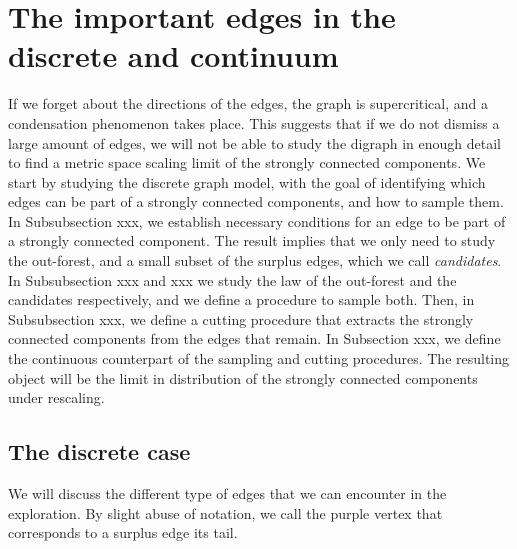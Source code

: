 \section{The important edges in the discrete and continuum}
If we forget about the directions of the edges, the graph is supercritical, and a condensation phenomenon takes place. This suggests that if we do not dismiss a large amount of edges, we will not be able to study the digraph in enough detail to find a metric space scaling limit of the strongly connected components. We start by studying the discrete graph model, with the goal of identifying which edges can be part of a strongly connected components, and how to sample them. In Subsubsection xxx, we establish necessary conditions for an edge to be part of a strongly connected component. The result implies that we only need to study the out-forest, and a small subset of the surplus edges, which we call \emph{candidates}. In Subsubsection xxx and xxx we study the law of the out-forest and the candidates respectively, and we define a procedure to sample both. Then, in Subsubsection xxx, we define a cutting procedure that extracts the strongly connected components from the edges that remain. 
In Subsection xxx, we define the continuous counterpart of the sampling and cutting procedures. The resulting object will be the limit in distribution of the strongly connected components under rescaling.
\subsection{The discrete case}\label{subsec.discrete}
We will discuss the different type of edges that we can encounter in the exploration. By slight abuse of notation, we call the purple vertex that corresponds to a surplus edge its tail.

